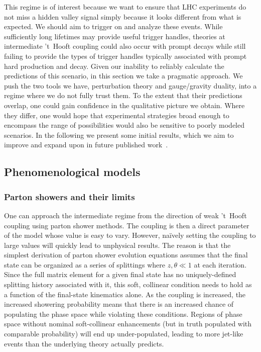 \begin{enumerate}
This regime is of interest because we want to ensure that LHC experiments do not miss a hidden valley signal simply because it looks different from what is expected. We should aim to trigger on and analyze these events. While sufficiently long lifetimes may provide useful trigger handles, theories at intermediate 't~Hooft coupling could also occur with prompt decays while still failing to provide the types of trigger handles typically associated with prompt hard production and decay. Given our inability to reliably calculate the predictions of this scenario, in this section we  take a pragmatic approach. We  push the two tools we have, perturbation theory and gauge/gravity duality, into a regime where we do not fully trust them. To the extent that their predictions overlap, one could gain confidence in the qualitative picture we obtain. Where they differ, one would hope that experimental strategies broad enough to encompass the range of possibilities would also be sensitive to poorly modeled scenarios. In the following we present some initial results, which we aim to improve and expand upon in future published work~\cite{showersinprogress}.


\subsection{Phenomenological models}

\subsubsection{Parton showers and their limits}

One can  approach the intermediate regime from the direction of weak 't~Hooft coupling using parton shower methods. The coupling is then a direct parameter of the model whose value is easy to vary. However, na\"ively setting the coupling to large values will quickly lead to unphysical results. The reason is that the simplest derivation of parton shower evolution equations assumes that the final state can be organized as a series of splittings where $z, \theta \ll 1$ at each iteration. Since the full matrix element for a given final state has no uniquely-defined splitting history associated with it, this soft, collinear condition needs to hold as a function of the final-state kinematics alone. As the coupling is increased, the increased showering probability means that there is an increased chance of populating the phase space while violating these conditions. Regions of phase space without nominal soft-collinear enhancements (but in truth  populated with comparable probability) will end up under-populated, leading to more jet-like events than the underlying theory actually predicts.


\end{enumerate}
